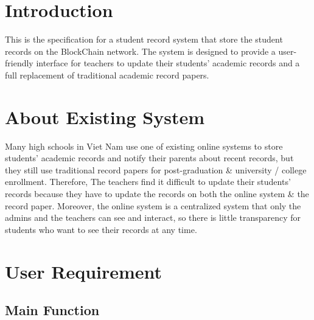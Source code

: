 \documentclass[
  letterpaper,
  DIV=11,
  numbers=noendperiod]{scrreprt}
\begin{document}
\hypertarget{introduction}{%
\section{Introduction}\label{introduction}}

This is the specification for a student record system that store the
student records on the BlockChain network. The system is designed to
provide a user-friendly interface for teachers to update their students'
academic records and a full replacement of traditional academic record
papers.

\hypertarget{about-existing-system}{%
\section{About Existing System}\label{about-existing-system}}

Many high schools in Viet Nam use one of existing online systems to
store students' academic records and notify their parents about recent
records, but they still use traditional record papers for
post-graduation \& university / college enrollment. Therefore, The
teachers find it difficult to update their students' records because
they have to update the records on both the online system \& the record
paper. Moreover, the online system is a centralized system that only the
admins and the teachers can see and interact, so there is little
transparency for students who want to see their records at any time.

\hypertarget{user-requirement}{%
\section{User Requirement}\label{user-requirement}}

\hypertarget{main-function}{%
\subsection{Main Function}\label{main-function}}
\end{document}
